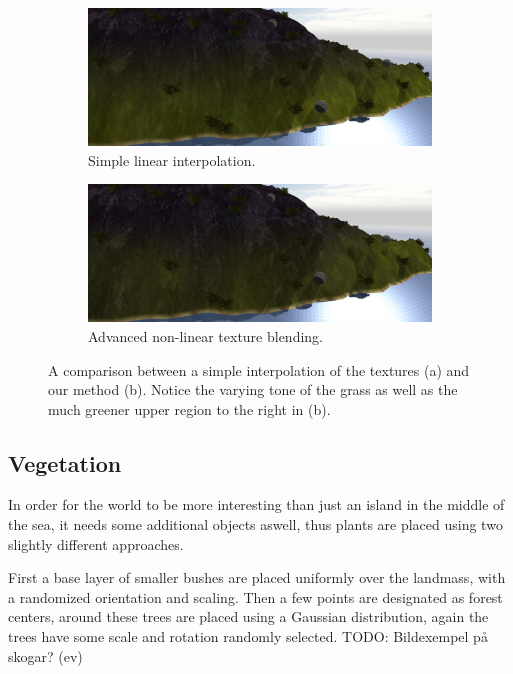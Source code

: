 \begin{figure}[H]
\begin{subfigure}{0.9\textwidth}
  \centering
  \includegraphics[width=0.9\linewidth]{images/textureBlendingComparison2_simple.jpg}
  \caption{Simple linear interpolation.}
\end{subfigure}

\begin{subfigure}{0.9\textwidth}
  \centering
  \includegraphics[width=0.9\linewidth]{images/textureBlendingComparison2_advanced.jpg}
  \caption{Advanced non-linear texture blending.}
\end{subfigure}
\caption{A comparison between a simple interpolation of the textures (a) and our method (b). Notice the varying tone of the grass as well as the much greener upper region to the right in (b).}
\label{fig:textureComparison2}
\end{figure}

\newpage
\subsection{Vegetation}
In order for the world to be more interesting than just an island in the middle of the sea, it needs some additional objects aswell, thus plants are placed using two slightly different approaches.

First a base layer of smaller bushes are placed uniformly over the landmass, with a randomized orientation and scaling. Then a few points are designated as forest centers, around these trees are placed using a Gaussian distribution, again the trees have some scale and rotation randomly selected.
TODO: Bildexempel på skogar? (ev)

